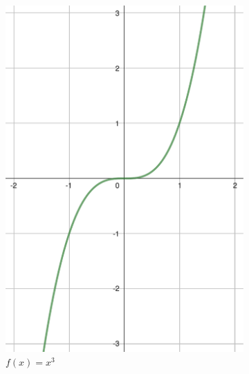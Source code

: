 \begin{figure}[h]
    \centering
    \begin{subfigure}{0.35\textwidth}
        \includegraphics[width=\textwidth]{tex/chapter_2/assets/y=x^3.pdf}
        \caption*{$f(x) = x^3$}
    \end{subfigure}
    \hfill
    \begin{subfigure}{0.35\textwidth}

\end{subfigure}
\end{figure}
